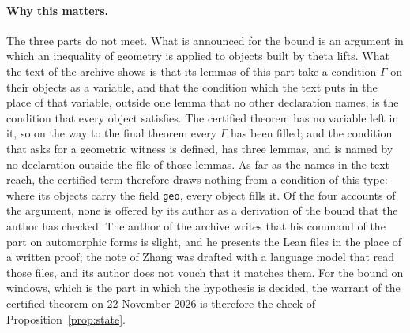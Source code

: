 \documentclass[11pt]{article}
\theoremstyle{definition}
\theoremstyle{remark}
\DeclareRobustCommand{\lean}[1]{{\renewcommand{\_}{\textunderscore\allowbreak}\texttt{#1}}}
\begin{document}
\paragraph{Why this matters.} The three parts do not meet. What is announced for the bound is an argument in which an inequality of geometry is applied to objects built by theta lifts. What the text of the archive shows is that its lemmas of this part take a condition $\Gamma$ on their objects as a variable, and that the condition which the text puts in the place of that variable, outside one lemma that no other declaration names, is the condition that every object satisfies. The certified theorem has no variable left in it, so on the way to the final theorem every $\Gamma$ has been filled; and the condition that asks for a geometric witness is defined, has three lemmas, and is named by no declaration outside the file of those lemmas. As far as the names in the text reach, the certified term therefore draws nothing from a condition of this type: where its objects carry the field \lean{geo}, every object fills it. Of the four accounts of the argument, none is offered by its author as a derivation of the bound that the author has checked. The author of the archive writes that his command of the part on automorphic forms is slight, and he presents the Lean files in the place of a written proof; the note of Zhang was drafted with a language model that read those files, and its author does not vouch that it matches them. For the bound on windows, which is the part in which the hypothesis is decided, the warrant of the certified theorem on 22 November 2026 is therefore the check of Proposition~\ref{prop:state}.
\end{document}
